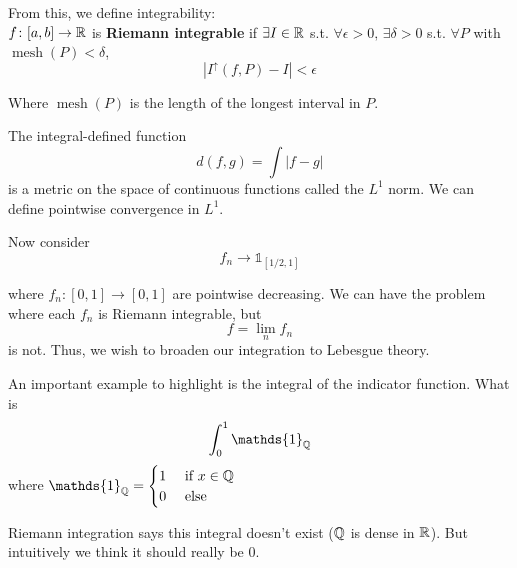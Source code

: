 \documentclass[11pt]{article}
\begin{document}
From this, we define integrability:\\
 $f\colon [a, b] \to \mathbb{R}$ is \textbf{Riemann integrable} if $\exists I \in \mathbb{R}$ s.t. $\forall \epsilon > 0, \, \exists \delta > 0$ s.t. $\forall P$ with $\operatorname{mesh}(P) < \delta$,
\[|I^{\uparrow}(f, P) - I| < \epsilon\]

Where $\operatorname{mesh}(P)$ is the length of the longest interval in $P$.

The integral-defined function
\[d(f, g) = \int|f-g|\]
is a metric on the space of continuous functions called the $L^1$ norm. We can define pointwise convergence in $L^1$.

Now consider
\[f_n \to \mathds{1}_{[1/2, 1]}\]

where $f_n\colon [0,1] \to [0,1]$ are pointwise decreasing. We can have the problem where each $f_n$ is Riemann integrable, but
\[f = \lim_n f_n\]
is not. Thus, we wish to broaden our integration to Lebesgue theory.

An important example to highlight is the integral of the indicator function. What is
\[\int_0^1 \mathds{1}_{\Q}\]
where $\mathds{1}_{\Q} = \begin{cases}
	1 & \text{ if $x \in \Q$}\\
	0 & \text{ else}
\end{cases}$

Riemann integration says this integral doesn't exist ($\mathbb{Q}$ is dense in $\mathbb{R}$). But intuitively we think it should really be $0$.
\end{document}
